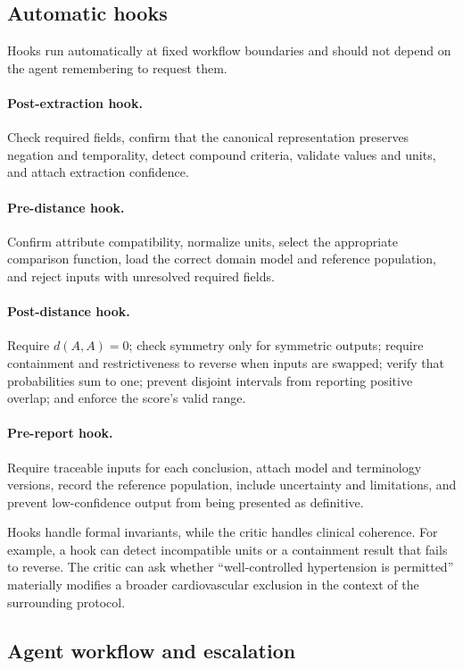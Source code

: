 \documentclass[11pt]{article}
\begin{document}
\subsection{Automatic hooks}

Hooks run automatically at fixed workflow boundaries and should not depend on the agent remembering to request them.

\paragraph{Post-extraction hook.}
Check required fields, confirm that the canonical representation preserves negation and temporality, detect compound criteria, validate values and units, and attach extraction confidence.

\paragraph{Pre-distance hook.}
Confirm attribute compatibility, normalize units, select the appropriate comparison function, load the correct domain model and reference population, and reject inputs with unresolved required fields.

\paragraph{Post-distance hook.}
Require $d(A,A)=0$; check symmetry only for symmetric outputs; require containment and restrictiveness to reverse when inputs are swapped; verify that probabilities sum to one; prevent disjoint intervals from reporting positive overlap; and enforce the score's valid range.

\paragraph{Pre-report hook.}
Require traceable inputs for each conclusion, attach model and terminology versions, record the reference population, include uncertainty and limitations, and prevent low-confidence output from being presented as definitive.

Hooks handle formal invariants, while the critic handles clinical coherence. For example, a hook can detect incompatible units or a containment result that fails to reverse. The critic can ask whether ``well-controlled hypertension is permitted'' materially modifies a broader cardiovascular exclusion in the context of the surrounding protocol.

\subsection{Agent workflow and escalation}
\end{document}
